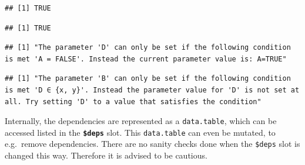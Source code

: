 \documentclass[
]{scrbook}
\newenvironment{Shaded}{\begin{snugshade}}{\end{snugshade}}
\newcommand{\AttributeTok}[1]{\textcolor[rgb]{0.77,0.63,0.00}{#1}}
\newcommand{\CommentTok}[1]{\textcolor[rgb]{0.56,0.35,0.01}{\textit{#1}}}
\newcommand{\ConstantTok}[1]{\textcolor[rgb]{0.00,0.00,0.00}{#1}}
\newcommand{\DecValTok}[1]{\textcolor[rgb]{0.00,0.00,0.81}{#1}}
\newcommand{\FunctionTok}[1]{\textcolor[rgb]{0.00,0.00,0.00}{#1}}
\newcommand{\NormalTok}[1]{#1}
\newcommand{\SpecialCharTok}[1]{\textcolor[rgb]{0.00,0.00,0.00}{#1}}
\newcommand{\StringTok}[1]{\textcolor[rgb]{0.31,0.60,0.02}{#1}}
\renewenvironment{Shaded} {\begin{snugshade}\small} {\end{snugshade}}
\begin{document}
\begin{verbatim}
## [1] TRUE
\end{verbatim}

\begin{Shaded}
\end{Shaded}

\begin{verbatim}
## [1] TRUE
\end{verbatim}

\begin{Shaded}
\end{Shaded}

\begin{verbatim}
## [1] "The parameter 'D' can only be set if the following condition is met 'A = FALSE'. Instead the current parameter value is: A=TRUE"
\end{verbatim}

\begin{Shaded}
\end{Shaded}

\begin{verbatim}
## [1] "The parameter 'B' can only be set if the following condition is met 'D ∈ {x, y}'. Instead the parameter value for 'D' is not set at all. Try setting 'D' to a value that satisfies the condition"
\end{verbatim}

Internally, the dependencies are represented as a \texttt{data.table}, which can be accessed listed in the \textbf{\texttt{\$deps}} slot.
This \texttt{data.table} can even be mutated, to e.g.~remove dependencies.
There are no sanity checks done when the \texttt{\$deps} slot is changed this way.
Therefore it is advised to be cautious.
\end{document}
